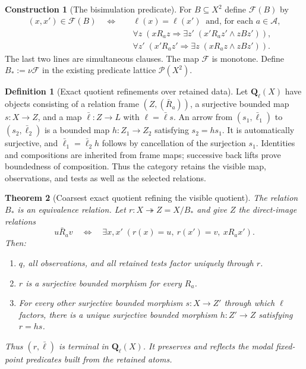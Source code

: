 \documentclass[11pt,a4paper]{article}
\numberwithin{equation}{section}
\newtheorem{theorem}{Theorem}[section]
\theoremstyle{definition}
\newtheorem{definition}[theorem]{Definition}
\newtheorem{construction}[construction]{Construction}
\theoremstyle{remark}
\theoremstyle{plain}
\begin{document}
\begin{construction}[The bisimulation predicate]
\label{con:egt-retained-bisimulation}
For $B\subseteq X^2$ define $\mathcal F(B)$ by
\begin{align*}
 (x,x')\in\mathcal F(B)\quad\Longleftrightarrow\quad
 &\ell(x)=\ell(x')\ \text{ and, for each }a\in\mathcal A,\\
 &\forall z\;(xR_az\Rightarrow
       \exists z'\;(x'R_az'\wedge zBz')),\\
 &\forall z'\;(x'R_az'\Rightarrow
       \exists z\;(xR_az\wedge zBz')).
\end{align*}
The last two lines are simultaneous clauses. The map $\mathcal F$ is
monotone. Define $B_*:=\nu\mathcal F$ in the existing predicate lattice
$\mathcal P(X^2)$.
\end{construction}

\begin{definition}[Exact quotient refinements over retained data]
\label{def:egt-exact-quotient-category}
Let $\mathbf Q_\ell(X)$ have objects consisting of a relation frame
$(Z,(\bar R_a))$, a surjective bounded map $s:X\to Z$, and a map
$\bar\ell:Z\to L$ with $\ell=\bar\ell s$. An arrow from
$(s_1,\bar\ell_1)$ to $(s_2,\bar\ell_2)$ is a bounded map
$h:Z_1\to Z_2$ satisfying $s_2=hs_1$. It is automatically
surjective, and $\bar\ell_1=\bar\ell_2h$ follows by cancellation
of the surjection $s_1$. Identities and compositions are inherited from
frame maps; successive back lifts prove boundedness of composition.
Thus the category retains the visible map, observations, and tests
as well as the selected relations.
\end{definition}

\begin{theorem}[Coarsest exact quotient refining the visible quotient]
\label{thm:egt-exact-visible-refinement}
The relation $B_*$ is an equivalence relation. Let $r:X\twoheadrightarrow
Z=X/B_*$ and give $Z$ the direct-image relations
\[
 u\bar R_av\quad\Longleftrightarrow\quad
 \exists x,x'\;(r(x)=u,\ r(x')=v,\ xR_ax').
\]
Then:
\begin{enumerate}
\item $q$, all observations, and all retained tests factor uniquely through $r$.
\item $r$ is a surjective bounded morphism for every $R_a$.
\item For every other surjective bounded morphism $s:X\to Z'$ through
which $\ell$ factors, there is a unique surjective bounded morphism
$h:Z'\to Z$ satisfying $r=hs$.
\end{enumerate}
Thus $(r,\bar\ell)$ is terminal in $\mathbf Q_\ell(X)$.
It preserves and reflects the modal fixed-point predicates built
from the retained atoms.
\end{theorem}
\end{document}

